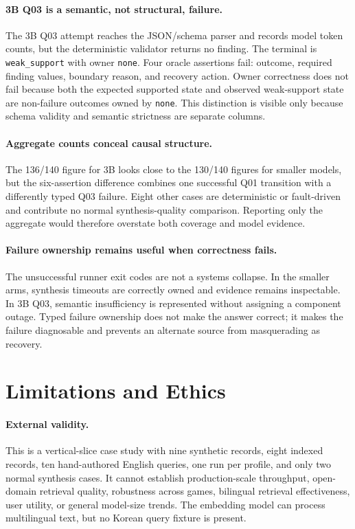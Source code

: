 \documentclass[10pt,twocolumn]{article}
\newcommand{\code}[1]{\texttt{#1}}
\begin{document}
\paragraph{3B Q03 is a semantic, not structural, failure.}
The 3B Q03 attempt reaches the JSON/schema parser and records model token counts, but the deterministic validator returns no finding.  The terminal is \code{weak\_support} with owner \code{none}.  Four oracle assertions fail: outcome, required finding values, boundary reason, and recovery action.  Owner correctness does not fail because both the expected supported state and observed weak-support state are non-failure outcomes owned by \code{none}.  This distinction is visible only because schema validity and semantic strictness are separate columns.

\paragraph{Aggregate counts conceal causal structure.}
The 136/140 figure for 3B looks close to the 130/140 figures for smaller models, but the six-assertion difference combines one successful Q01 transition with a differently typed Q03 failure.  Eight other cases are deterministic or fault-driven and contribute no normal synthesis-quality comparison.  Reporting only the aggregate would therefore overstate both coverage and model evidence.

\paragraph{Failure ownership remains useful when correctness fails.}
The unsuccessful runner exit codes are not a systems collapse.  In the smaller arms, synthesis timeouts are correctly owned and evidence remains inspectable.  In 3B Q03, semantic insufficiency is represented without assigning a component outage.  Typed failure ownership does not make the answer correct; it makes the failure diagnosable and prevents an alternate source from masquerading as recovery.

\section{Limitations and Ethics}
\paragraph{External validity.}
This is a vertical-slice case study with nine synthetic records, eight indexed records, ten hand-authored English queries, one run per profile, and only two normal synthesis cases.  It cannot establish production-scale throughput, open-domain retrieval quality, robustness across games, bilingual retrieval effectiveness, user utility, or general model-size trends.  The embedding model can process multilingual text, but no Korean query fixture is present.
\end{document}

